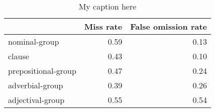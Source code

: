 \begin{table}[!ht]
\centering
\begin{tabular}{lrr}
\toprule
{} &  Miss rate &  False omission rate \\
\midrule
nominal-group       &       0.59 &                 0.13 \\
clause              &       0.43 &                 0.10 \\
prepositional-group &       0.47 &                 0.24 \\
adverbial-group     &       0.39 &                 0.26 \\
adjectival-group    &       0.55 &                 0.54 \\
\bottomrule
\end{tabular}
\caption{My caption here}
\label{tab:unit-types-combined-errors}
\end{table}